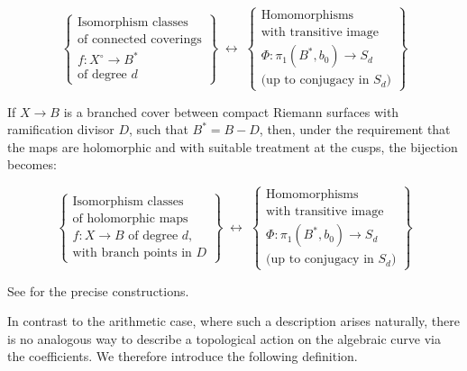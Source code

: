 \documentclass[10pt]{amsart}
\theoremstyle{definition}
\begin{document}
\[
\left\{
\begin{array}{c}
\text{Isomorphism classes}  \\
\text{of connected coverings} \\ 
f \colon X^\circ \rightarrow B^* \\
\text{of degree } d
\end{array}
\right\}
\; \longleftrightarrow \;
\left\{
\begin{array}{c}
\text{Homomorphisms} \\
\text{with transitive image} \\
\Phi \colon \pi_1(B^*,b_0) \rightarrow S_d \\
\text{(up to conjugacy in } S_d \text{)}
\end{array}
\right\}
\]

\vspace{0.3 cm}
If $X\rightarrow B$ is a branched cover between compact Riemann surfaces with ramification divisor $D$, such that $B^* = B - D$, then, under the requirement that the maps are holomorphic and with suitable treatment at the cusps, the bijection becomes:

\[
\left\{
\begin{array}{c}
\text{Isomorphism classes} \\
\text{of holomorphic maps} \\
f \colon X \rightarrow B \text{ of degree } d, \\
\text{with branch points in } D
\end{array}
\right\}
\; \longleftrightarrow \;
\left\{
\begin{array}{c}
\text{Homomorphisms} \\
\text{with transitive image} \\
\Phi \colon \pi_1(B^*,b_0) \rightarrow S_d \\
\text{(up to conjugacy in } S_d \text{)}
\end{array}
\right\}
\]

\vspace{0.3 cm}
See \cite[Ch. 3.4]{MR1326604} for the precise constructions.


In contrast to the arithmetic case, where such a description arises naturally, there is no analogous way to describe a topological action on the algebraic curve via the coefficients. We therefore introduce the following definition. 
\end{document}

